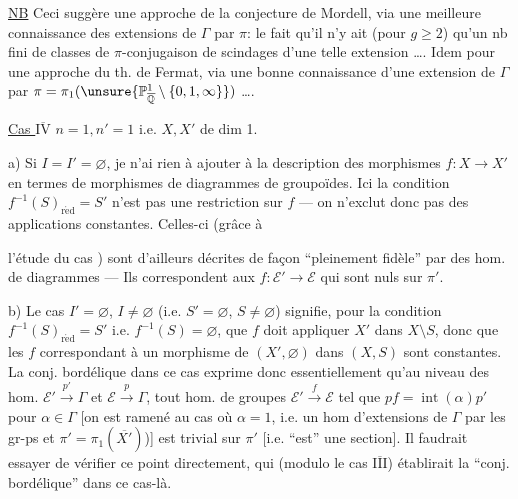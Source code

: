 
\uline{NB} Ceci suggère une approche de la conjecture de Mordell, via une meilleure connaissance des extensions de $\Gamma$ par $\pi$: le fait qu'il n'y ait (pour $g\ge2$) qu'un nb fini de classes de $\pi$-conjugaison de scindages d'une telle extension \ldots.
Idem pour une approche du th. de Fermat, via  une bonne connaissance d'une extension de $\Gamma$ par $\pi=\pi_1(\unsure{\mathbb P^1_{\overline{\mathbb Q}}\setminus\{0,1,\infty\}})$ \ldots.

\uline{Cas $\overline{\mathrm{IV}}$} $n=1,n'=1$ i.e. $X,X'$ de dim 1.

a) Si $I=I'=\varnothing$, je n'ai rien à ajouter à la description des morphismes $f:X\to X'$ en termes de morphismes de diagrammes de groupoïdes. Ici  la condition $f^{-1}(S)_{\mathrm{r\acute ed}}=S'$ n'est pas une restriction sur $f$ ---  on n'exclut donc pas des applications constantes. Celles-ci (grâce à


l'étude du cas \uline{}) sont d'ailleurs décrites de façon ``pleinement fidèle'' par des hom. de diagrammes --- Ils correspondent aux  $f:\mathcal E'\to\mathcal E$ qui sont nuls sur $\pi'$.

b) Le cas $I'=\varnothing$, $I\ne\varnothing$ (i.e. $S'=\varnothing$, $S\ne\varnothing$) signifie, pour la condition $f^{-1}(S)_{\mathrm{r\acute ed}}=S'$ i.e. $f^{-1}(S)=\varnothing$, que $f$ doit appliquer $X'$ dans $X\setminus S$,  donc que les $f$ correspondant à un morphisme de $(X',\varnothing)$ dans $(X,S)$ sont constantes.
La conj. bordélique dans ce cas exprime donc  essentiellement qu'au niveau des hom. $\mathcal E'\xrightarrow{p'}\Gamma$ et $\mathcal E\xrightarrow{p}\Gamma$, tout hom. de groupes $\mathcal E'\xrightarrow{f}\mathcal E$ tel que $pf=\operatorname{int}(\alpha)p'$ pour $\alpha\in\Gamma$ [on est ramené au cas où $\alpha=1$,  i.e. un hom d'extensions de $\Gamma$ par les gr-ps  et $\pi'=\pi_1(\overline{X'})$)] est trivial sur $\pi'$ [i.e. ``est'' une section]. Il faudrait essayer de vérifier ce point directement, qui (modulo le cas \uline{$\overline{\mathrm{III}}$}) établirait la ``conj. bordélique'' dans ce cas-là.

